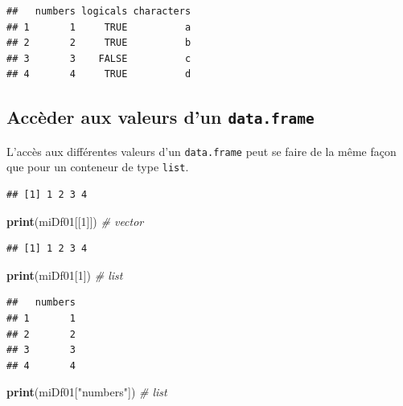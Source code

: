 \documentclass[]{book}
\newenvironment{Shaded}{\begin{snugshade}}{\end{snugshade}}
\newcommand{\CommentTok}[1]{\textcolor[rgb]{0.56,0.35,0.01}{\textit{#1}}}
\newcommand{\DecValTok}[1]{\textcolor[rgb]{0.00,0.00,0.81}{#1}}
\newcommand{\KeywordTok}[1]{\textcolor[rgb]{0.13,0.29,0.53}{\textbf{#1}}}
\newcommand{\NormalTok}[1]{#1}
\newcommand{\OperatorTok}[1]{\textcolor[rgb]{0.81,0.36,0.00}{\textbf{#1}}}
\newcommand{\StringTok}[1]{\textcolor[rgb]{0.31,0.60,0.02}{#1}}
\begin{document}
\begin{verbatim}
##   numbers logicals characters
## 1       1     TRUE          a
## 2       2     TRUE          b
## 3       3    FALSE          c
## 4       4     TRUE          d
\end{verbatim}

\hypertarget{acceder-aux-valeurs-dun-data.frame}{%
\subsection{\texorpdfstring{Accèder aux valeurs d'un \texttt{data.frame}}{Accèder aux valeurs d'un data.frame}}\label{acceder-aux-valeurs-dun-data.frame}}

L'accès aux différentes valeurs d'un \texttt{data.frame} peut se faire de la même façon que pour un conteneur de type \texttt{list}.

\begin{Shaded}
\end{Shaded}

\begin{verbatim}
## [1] 1 2 3 4
\end{verbatim}

\begin{Shaded}
\begin{Highlighting}[]
\KeywordTok{print}\NormalTok{(miDf01[[}\DecValTok{1}\NormalTok{]]) }\CommentTok{# vector}
\end{Highlighting}
\end{Shaded}

\begin{verbatim}
## [1] 1 2 3 4
\end{verbatim}

\begin{Shaded}
\begin{Highlighting}[]
\KeywordTok{print}\NormalTok{(miDf01[}\DecValTok{1}\NormalTok{]) }\CommentTok{# list}
\end{Highlighting}
\end{Shaded}

\begin{verbatim}
##   numbers
## 1       1
## 2       2
## 3       3
## 4       4
\end{verbatim}

\begin{Shaded}
\begin{Highlighting}[]
\KeywordTok{print}\NormalTok{(miDf01[}\StringTok{"numbers"}\NormalTok{]) }\CommentTok{# list}
\end{Highlighting}
\end{Shaded}
\end{document}
